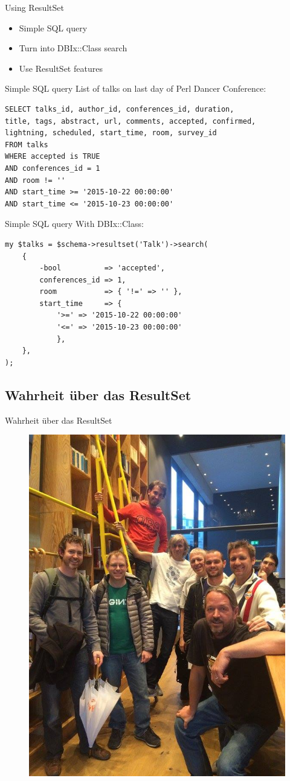 \begin{frame}{Using ResultSet}
\begin{itemize}
\item Simple SQL query
\item Turn into DBIx::Class search
\item Use ResultSet features
\end{itemize}
\end{frame}

\begin{frame}[fragile]{Simple SQL query}
List of talks on last day of Perl Dancer Conference:
\begin{lstlisting}
SELECT talks_id, author_id, conferences_id, duration,
title, tags, abstract, url, comments, accepted, confirmed, 
lightning, scheduled, start_time, room, survey_id 
FROM talks 
WHERE accepted is TRUE 
AND conferences_id = 1 
AND room != '' 
AND start_time >= '2015-10-22 00:00:00'
AND start_time <= '2015-10-23 00:00:00'
\end{lstlisting}
\end{frame}

\begin{frame}[fragile]{Simple SQL query}
With DBIx::Class:
\begin{lstlisting}
my $talks = $schema->resultset('Talk')->search(
    {
        -bool          => 'accepted',
        conferences_id => 1,
        room           => { '!=' => '' },
        start_time     => {
            '>=' => '2015-10-22 00:00:00'
            '<=' => '2015-10-23 00:00:00'
            },
    },
);
\end{lstlisting}
\end{frame}

\subsection{Wahrheit über das ResultSet}

\begin{frame}{Wahrheit über das ResultSet}
\begin{figure}[!ht]
\centering
\includegraphics[width=0.5\linewidth]{img/pdc_users.jpg}
\end{figure}
\end{frame}

